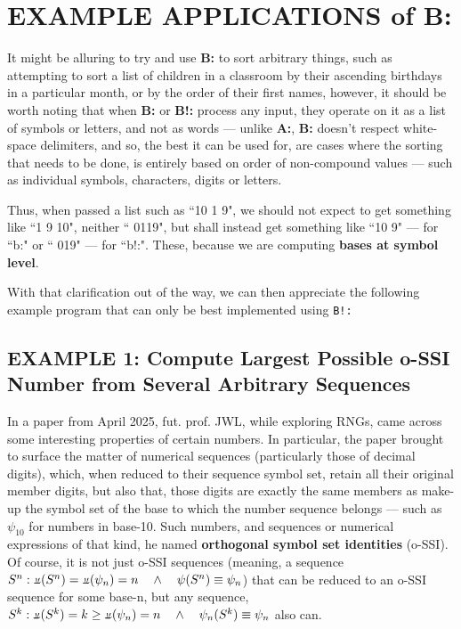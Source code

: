 \documentclass[a4paper, 18pt]{book} %
\newcommand{\invpi}{\rotatebox[origin=c]{180}{$\pi$}}
\begin{document}
\section{EXAMPLE APPLICATIONS of B:}
\label{SECEXAMPB}

It might be alluring to try and use \textbf{B:} to sort arbitrary things, such as attempting to sort a list of children in a classroom by their ascending birthdays in a particular month, or by the order of their first names, however, it should be worth noting that when \textbf{B:} or \textbf{B!:} process any input, they operate on it as a list of symbols or letters, and not as words --- unlike \textbf{A:}, \textbf{B:} doesn't respect white-space delimiters, and so, the best it can be used for, are cases where the sorting that needs to be done, is entirely based on order of non-compound values --- such as individual symbols, characters, digits or letters.

Thus, when passed a list such as ``10 1 9", we should not expect to get something like ``1 9 10", neither `` 0119", but shall instead get something like ``10 9" --- for ``b:" or `` 019" --- for ``b!:". These, because we are computing \textbf{bases at symbol level}.

With that clarification out of the way, we can then appreciate the following example program that can only be best implemented using \texttt{B!:}

\subsection{EXAMPLE 1: Compute Largest Possible o-SSI Number from Several Arbitrary Sequences}
\label{SECEXAMP1B}

In a paper from April 2025, fut. prof. JWL, while exploring RNGs, came across some interesting properties of certain numbers. In particular, the paper \cite{ossipaper} brought to surface the matter of numerical sequences (particularly those of decimal digits), which, when reduced to their sequence symbol set\cite{transformatics}, retain all their original member digits, but also that, those digits are exactly the same members as make-up the symbol set of the base to which the number sequence belongs --- such as $\psi_{10}$ for numbers in base-10. Such numbers, and sequences or numerical expressions of that kind, he named \textbf{orthogonal symbol set identities} (o-SSI). Of course, it is not just o-SSI sequences (meaning, a sequence $S^n: \invpi(S^n) = \invpi(\psi_{n}) = n \quad \land \quad \psi(S^n) \equiv \psi_n$) that can be reduced to an o-SSI sequence for some base-n, but any sequence, $S^k: \invpi(S^k) = k \geq \invpi(\psi_{n}) = n \quad \land \quad \psi_n(S^k) \equiv \psi_n$ also can. 
\end{document}
